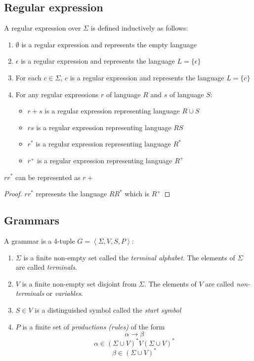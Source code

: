 \subsection{Regular expression}

\begin{defn}
  A regular expression over $\Sigma$ is defined inductively as follows:
  \begin{enumerate}
  \item $\emptyset$ is a regular expression and represents the empty language
  \item $\epsilon$ is a regular expression and represents the language
    $L = \{ \epsilon \}$
  \item For each $c \in \Sigma$, $c$ is a regular expression and
    represents the language $L = \{ c \}$
  \item For any regular expressions $r$ of language $R$ and $s$ of language $S$:
    \begin{itemize}
    \item $r+s$ is a regular expression representing language $R \cup S$
    \item $r s$ is a regular expression representing language $R S$
    \item $r^*$ is a regular expression representing language $R^*$
    \item $r^+$ is a regular expression representing language $R^+$
    \end{itemize}
  \end{enumerate}
\end{defn}

\begin{thm}
  $r r^*$ can be represented as $r+$
\end{thm}

\begin{proof}
  $r r^*$ represents the language $R R^*$ which is $R^+$
\end{proof}

\subsection{Grammars}

\begin{defn}[Grammar]
  A grammar is a 4-tuple $G = \left< \Sigma, V, S, P \right>$:
  \begin{enumerate}
  \item $\Sigma$ is a finite non-empty set called the \emph{terminal
    alphabet}. The elements of $\Sigma$ are called \emph{terminals}.
  \item $V$ is a finite non-empty set disjoint from $\Sigma$. The
    elements of $V$ are called \emph{non-terminals} or \emph{variables}.
  \item $S \in V$ is a distinguished symbol called the \emph{start symbol}
  \item $P$ is a finite set of \emph{productions (rules)} of the form
    $$ \alpha \rightarrow \beta $$
    $$ \alpha \in (\Sigma \cup V)^* V (\Sigma \cup V)^* $$
    $$ \beta \in (\Sigma \cup V)^* $$
  \end{enumerate}
\end{defn}

